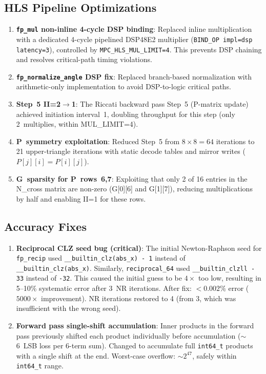 \documentclass[11pt,a4paper]{article}
\begin{document}
\subsection{HLS Pipeline Optimizations}
\begin{enumerate}
  \item \textbf{\texttt{fp\_mul} non-inline 4-cycle DSP binding}: Replaced inline multiplication with a dedicated 4-cycle pipelined DSP48E2 multiplier (\texttt{BIND\_OP impl=dsp latency=3}), controlled by \texttt{MPC\_HLS\_MUL\_LIMIT=4}. This prevents DSP chaining and resolves critical-path timing violations.
  \item \textbf{\texttt{fp\_normalize\_angle} DSP fix}: Replaced branch-based normalization with arithmetic-only implementation to avoid DSP-to-logic critical paths.
  \item \textbf{Step~5 II=2$\to$1}: The Riccati backward pass Step~5 (P-matrix update) achieved initiation interval~1, doubling throughput for this step (only 2~multiplies, within MUL\_LIMIT=4).
  \item \textbf{P~symmetry exploitation}: Reduced Step~5 from $8\times8=64$ iterations to 21 upper-triangle iterations with static decode tables and mirror writes ($P[j][i] = P[i][j]$).
  \item \textbf{G~sparsity for P~rows~6,7}: Exploiting that only 2 of 16 entries in the N\_cross matrix are non-zero (G[0][6] and G[1][7]), reducing multiplications by half and enabling II=1 for these rows.
\end{enumerate}

\subsection{Accuracy Fixes}
\begin{enumerate}
  \item \textbf{Reciprocal CLZ seed bug (critical)}: The initial Newton-Raphson seed for \texttt{fp\_recip} used \texttt{\_\_builtin\_clz(abs\_x) - 1} instead of \texttt{\_\_builtin\_clz(abs\_x)}. Similarly, \texttt{reciprocal\_64} used \texttt{\_\_builtin\_clzll - 33} instead of \texttt{-32}. This caused the initial guess to be $4\times$ too low, resulting in 5--10\% systematic error after 3~NR iterations. After fix: $<0.002\%$ error ($5000\times$ improvement). NR iterations restored to 4 (from 3, which was insufficient with the wrong seed).
  \item \textbf{Forward pass single-shift accumulation}: Inner products in the forward pass previously shifted each product individually before accumulation ($\sim$6~LSB loss per 6-term sum). Changed to accumulate full \texttt{int64\_t} products with a single shift at the end. Worst-case overflow: $\sim 2^{47}$, safely within \texttt{int64\_t} range.
\end{enumerate}
\end{document}
